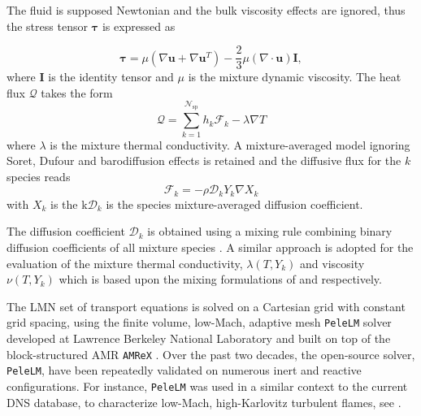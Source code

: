 The fluid is supposed Newtonian and the bulk viscosity effects are ignored, thus the stress tensor
$\boldsymbol{\tau}$ is expressed as

\begin{equation}
\mathbf{\tau}=\mu\left(\nabla\mathbf{u}+ \nabla\mathbf{u}^T\right)- \frac{2}{3}
\mu\left(\nabla\cdot\mathbf{u}\right)\mathbf{I},
\end{equation}
%
where $\mathbf{I}$ is the identity tensor and $\mu$ is the mixture dynamic viscosity.
%
The heat flux $\boldsymbol{\mathcal{Q}}$ takes the form 
%
\begin{equation}
    \boldsymbol{\mathcal{Q}} =  \sum_{k=1}^{\mathcal{N}_{\mathrm{sp}}} h_k \boldsymbol{\mathcal{F}}_{k}  - \lambda \nabla T
\end{equation}
%
where $\lambda$ is the mixture thermal conductivity.
%
A mixture-averaged model ignoring Soret, Dufour and barodiffusion effects is retained 
and the diffusive flux for the $k$\th species reads
\begin{equation}
    \boldsymbol{\mathcal{F}}_k = -\rho \mathcal{D}_k Y_k \nabla X_k
\end{equation}
%
with $X_k$ is the k\th $\mathcal{D}_k$ is the species mixture-averaged diffusion coefficient.

The diffusion coefficient $\mathcal{D}_k$ is obtained using a mixing rule combining binary diffusion coefficients of all mixture species \cite{hirschfelder1954molecular}.
%
A similar approach is adopted for the evaluation of the mixture thermal conductivity, 
$\lambda(T, Y_k)$ and viscosity $\nu(T, Y_k)$ which is based upon the mixing formulations
of \cite{mathur1967thermal} and \cite{wilke1950viscosity} respectively.


The LMN set of transport equations is solved on a Cartesian grid with constant grid spacing, using the finite volume, low-Mach, adaptive mesh \texttt{PeleLM} solver developed at Lawrence Berkeley National Laboratory \cite{almgren1998conservative,day2000numerical,nonaka2012deferred,pazner2016high,nonaka2018conservative} and built on top of the block-structured AMR \texttt{AMReX} 
\cite{zhang2019amrex} .
%
Over the past two decades, the open-source solver, \texttt{PeleLM}, have been repeatedly validated on numerous inert and reactive configurations.
%
For instance, \texttt{PeleLM} was used in a similar context to the current DNS database, to characterize low-Mach, high-Karlovitz turbulent flames, see \citet{aspden2015turbulence,aspden2016three,aspden2017turbulence,aspden2018towards}.

